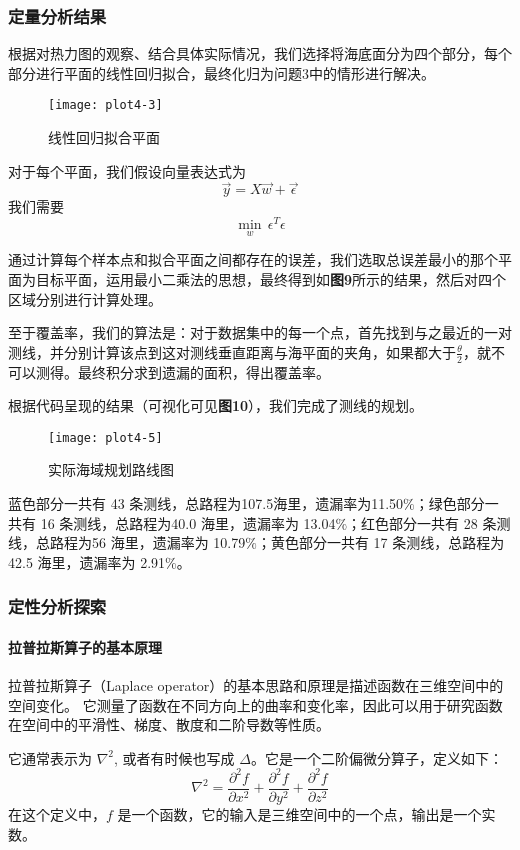 \documentclass{cumcmthesis}
\begin{document}
\subsubsection{定量分析结果}
根据对热力图的观察、结合具体实际情况，我们选择将海底面分为四个部分，每个部分进行平面的线性回归拟合，最终化归为问题3中的情形进行解决。
\begin{figure}[!h]
    \centering
    \texttt{[image: plot4-3]}
    \caption{线性回归拟合平面}
    \label{fig:plot4-3}
\end{figure}
\FloatBarrier
对于每个平面，我们假设向量表达式为
\begin{equation}
\Vec{y} = X \Vec{w} + \vec{\epsilon}
\end{equation}
我们需要
\begin{equation}
\mathop{\min}_{w} \, \epsilon^T\epsilon
\end{equation}

通过计算每个样本点和拟合平面之间都存在的误差，我们选取总误差最小的那个平面为目标平面，运用最小二乘法的思想，最终得到如\textbf{图9}所示的结果，然后对四个区域分别进行计算处理。

至于覆盖率，我们的算法是：对于数据集中的每一个点，首先找到与之最近的一对测线，并分别计算该点到这对测线垂直距离与海平面的夹角，如果都大于$\frac{\theta}{2}$，就不可以测得。最终积分求到遗漏的面积，得出覆盖率。

根据代码呈现的结果（可视化可见\textbf{图10}），我们完成了测线的规划。
\begin{figure}[!h]
    \centering
    \texttt{[image: plot4-5]}
    \caption{实际海域规划路线图}
    \label{fig:plot4-3}
\end{figure}
蓝色部分一共有 43 条测线，总路程为107.5海里，遗漏率为11.50$\%$；绿色部分一共有 16 条测线，总路程为40.0 海里，遗漏率为 13.04$\%$；红色部分一共有 28 条测线，总路程为56 海里，遗漏率为 10.79$\%$；黄色部分一共有 17 条测线，总路程为42.5 海里，遗漏率为 2.91$\%$。
\subsubsection{定性分析探索}
\paragraph*{拉普拉斯算子的基本原理}
拉普拉斯算子（Laplace operator）的基本思路和原理是描述函数在三维空间中的空间变化。
它测量了函数在不同方向上的曲率和变化率，因此可以用于研究函数在空间中的平滑性、梯度、散度和二阶导数等性质。

它通常表示为 $\nabla^2$, 或者有时候也写成 $\Delta$。它是一个二阶偏微分算子，定义如下：
\[\nabla^2 = \frac{\partial^2 f}{\partial x^2} + \frac{\partial^2 f}{\partial y^2} + \frac{\partial^2 f}{\partial z^2} \]
在这个定义中，$f$ 是一个函数，它的输入是三维空间中的一个点，输出是一个实数。
\end{document}
